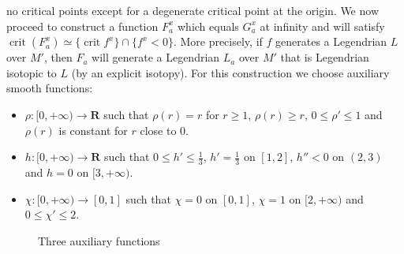 \documentclass[reqno]{amsart}
\newcommand{\THOMAS}[1]%
	{\begin{quotation}{\footnotesize\textcolor{brown}{\textbf{Thomas:} #1}}\end{quotation}}
\theoremstyle{theorem}
\theoremstyle{remark}
\theoremstyle{definition}
\DeclareMathOperator{\crit}{crit}
\newcommand{\R}{\mathbf{R}}
\begin{document}
no critical points except for a degenerate critical point at the origin. We now proceed to
construct a function $F^x_a$ which equals $G^x_a$ at infinity and will satisfy $\crit(F^x_a)\simeq \{\crit f^x\}\cap\{f^x <0\}$.
More precisely, if $f$ generates a Legendrian $L$ over $M'$, then $F_a$ will generate a Legendrian $L_a$ over $M'$ that is Legendrian isotopic
to $L$ (by an explicit isotopy). For this construction we choose auxiliary smooth functions:
\begin{itemize}
\item $\rho:[0,+\infty)\to \R$ such that $\rho(r)=r$ for $r\geq 1$, $\rho(r)\geq r$, $0\leq \rho'\leq 1$ and $\rho(r)$ is constant for $r$ close to $0$.
\item $h:[0,+\infty)\to \R$ such that $0\leq h'\leq \frac{1}{3}$, $h'=\frac{1}{3}$ on $[1,2]$, $h''<0$ on $(2,3)$ and $h=0$ on $[3,+\infty)$.
\item $\chi:[0,+\infty)\to [0,1]$ such that $\chi=0$ on $[0,1]$, $\chi=1$ on $[2,+\infty)$ and $0\leq \chi'\leq 2$.
\end{itemize}


\begin{figure}[h]
  \centering
  \caption{Three auxiliary functions}
\label{fig:three_functions}
\end{figure}
\end{document}
